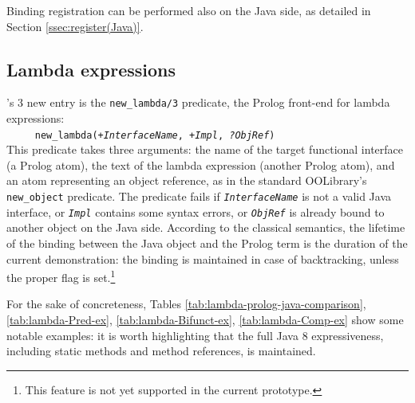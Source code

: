 Binding registration can be performed also on the Java side, as detailed in Section \ref{ssec:register(Java)}.


\subsection{Lambda expressions}
\label{ssec:lambda-expressions}

\tuprolog{}'s 3 new entry is the \texttt{new\_lambda/3} predicate, the Prolog front-end for lambda expressions:\\

\texttt{~~~~~new\_lambda(\textit{+InterfaceName}, \textit{+Impl}, \textit{?ObjRef})}\\

\noindent This predicate takes three arguments: the name of the target functional interface (a Prolog atom), the text of the lambda expression (another Prolog atom), and an atom representing an object reference, as in the standard OOLibrary's \texttt{new\_object} predicate. 
The predicate fails if \texttt{\textit{InterfaceName}} is not a valid Java interface, or \texttt{\textit{Impl}} contains some syntax errors, or \texttt{\textit{ObjRef}} is already bound to another object on the Java side.
According to the classical \tuprolog{} semantics, the lifetime of the binding between the Java object and the Prolog term is the duration of the current demonstration: the binding is maintained in case of backtracking, unless the proper \tuprolog{} flag is set.\footnote{This feature is not yet supported in the current prototype.}

For the sake of concreteness, Tables \ref{tab:lambda-prolog-java-comparison}, \ref{tab:lambda-Pred-ex}, \ref{tab:lambda-Bifunct-ex}, \ref{tab:lambda-Comp-ex} show some notable examples: it is worth highlighting that the full Java 8 expressiveness, including static methods and method references, is maintained.

